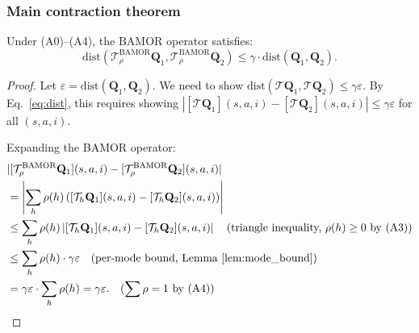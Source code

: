 \subsubsection{Main contraction theorem}

\begin{theorem}
\label{thm:bamor_contraction}
Under (A0)--(A4), the BAMOR operator satisfies:
\begin{equation}
    \mathrm{dist}(\mathcal{T}^{\mathrm{BAMOR}}_\rho \mathbf{Q}_1, \mathcal{T}^{\mathrm{BAMOR}}_\rho \mathbf{Q}_2) \le \gamma \cdot \mathrm{dist}(\mathbf{Q}_1, \mathbf{Q}_2).
\end{equation}
\end{theorem}

\begin{proof}
Let $\varepsilon = \mathrm{dist}(\mathbf{Q}_1, \mathbf{Q}_2)$.  We need to show $\mathrm{dist}(\mathcal{T}\mathbf{Q}_1, \mathcal{T}\mathbf{Q}_2) \le \gamma\varepsilon$.  By Eq.~\eqref{eq:dist}, this requires showing $|[\mathcal{T}\mathbf{Q}_1](s,a,i) - [\mathcal{T}\mathbf{Q}_2](s,a,i)| \le \gamma\varepsilon$ for all $(s,a,i)$.

Expanding the BAMOR operator:
\begin{align}
    &|[\mathcal{T}^{\mathrm{BAMOR}}_\rho \mathbf{Q}_1](s,a,i) - [\mathcal{T}^{\mathrm{BAMOR}}_\rho \mathbf{Q}_2](s,a,i)| \notag \\
    &= \left|\sum_{h} \rho(h) \left([\mathcal{T}_h \mathbf{Q}_1](s,a,i) - [\mathcal{T}_h \mathbf{Q}_2](s,a,i)\right)\right| \notag \\
    &\le \sum_{h} \rho(h) \left|[\mathcal{T}_h \mathbf{Q}_1](s,a,i) - [\mathcal{T}_h \mathbf{Q}_2](s,a,i)\right| \quad \text{(triangle inequality, $\rho(h) \ge 0$ by (A3))} \notag \\
    &\le \sum_{h} \rho(h) \cdot \gamma\varepsilon \quad \text{(per-mode bound, Lemma~\ref{lem:mode_bound})} \notag \\
    &= \gamma\varepsilon \cdot \sum_{h} \rho(h) = \gamma\varepsilon. \quad \text{($\sum \rho = 1$ by (A4))}
\end{align}


\end{proof}
